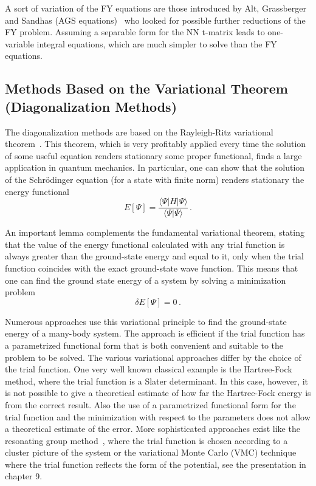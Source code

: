 A sort of variation of the FY equations are those introduced by Alt, Grassberger
and Sandhas (AGS equations)~\cite{AGS} who looked for possible further reductions of the FY problem. 
Assuming a separable form for the NN t-matrix leads to one-variable integral equations, which are much simpler 
to solve than the FY equations.

\subsection{Methods Based on the Variational Theorem (Diagonalization Methods)}\label{sec:VAR}
The diagonalization methods  are based on the Rayleigh-Ritz variational theorem~\cite{Ra870,Ri909}.
This theorem, which is very profitably applied every time  the solution of some useful equation renders stationary
some proper functional, finds a large application in quantum mechanics. In particular, one can show that the solution of the
Schr\"odinger equation (for a  state with finite norm) renders stationary  the energy
functional
\begin{equation}
 E[\Psi]=\frac{\langle\Psi|H|\Psi\rangle}{\langle\Psi|\Psi\rangle}\,.
\end{equation}

An important  lemma complements the fundamental variational theorem, stating that the value of the energy functional 
calculated with any trial function is always greater than the ground-state energy and equal to it, only when the trial function 
coincides with the exact ground-state wave function.
This means that one can find the ground state energy of a system by solving a minimization problem  
 \begin{equation}
 \delta E[\Psi]=0\,.\label{vareq}
\end{equation}

Numerous approaches use this variational principle to find the ground-state energy of a many-body system.
The approach is efficient if the trial function has a parametrized functional form that is both convenient 
and suitable to the problem to be solved. The various variational approaches differ by the choice of the trial function.
One very well known classical example is the Hartree-Fock method, where the trial function is a Slater determinant. 
In this case, however, it is not possible to give a theoretical estimate of how far the Hartree-Fock energy is from the correct result. 
Also the use of a parametrized functional form for the trial function and the minimization with respect to the parameters 
does not allow a theoretical  estimate of the error. More sophisticated approaches exist like the resonating group method~\cite{RGM1,RGM2}, 
where the trial function 
is chosen according to a cluster picture of the system  or the variational Monte Carlo (VMC) technique where the trial function reflects 
the form of the potential, see the presentation in chapter 9. 

